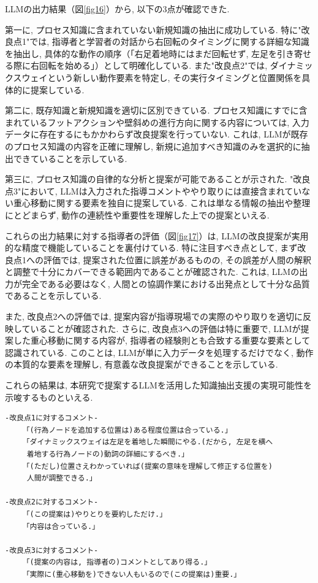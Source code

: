 LLMの出力結果（図\ref{fig16}）から, 以下の3点が確認できた.

第一に, プロセス知識に含まれていない新規知識の抽出に成功している. 特に"改良点1"では, 指導者と学習者の対話から右回転のタイミングに関する詳細な知識を抽出し, 具体的な動作の順序（「右足着地時にはまだ回転せず, 左足を引き寄せる際に右回転を始める」）として明確化している. また"改良点2"では, ダイナミックスウェイという新しい動作要素を特定し, その実行タイミングと位置関係を具体的に提案している.

第二に, 既存知識と新規知識を適切に区別できている. プロセス知識にすでに含まれているフットアクションや壁斜めの進行方向に関する内容については, 入力データに存在するにもかかわらず改良提案を行っていない. これは, LLMが既存のプロセス知識の内容を正確に理解し, 新規に追加すべき知識のみを選択的に抽出できていることを示している.

第三に, プロセス知識の自律的な分析と提案が可能であることが示された. "改良点3"において, LLMは入力された指導コメントややり取りには直接含まれていない重心移動に関する要素を独自に提案している. これは単なる情報の抽出や整理にとどまらず, 動作の連続性や重要性を理解した上での提案といえる.

これらの出力結果に対する指導者の評価（図\ref{fig17}）は, LLMの改良提案が実用的な精度で機能していることを裏付けている. 特に注目すべき点として, まず改良点1への評価では, 提案された位置に誤差があるものの, その誤差が人間の解釈と調整で十分にカバーできる範囲内であることが確認された. これは, LLMの出力が完全である必要はなく, 人間との協調作業における出発点として十分な品質であることを示している.

また, 改良点2への評価では, 提案内容が指導現場での実際のやり取りを適切に反映していることが確認された. さらに, 改良点3への評価は特に重要で, LLMが提案した重心移動に関する内容が, 指導者の経験則とも合致する重要な要素として認識されている. このことは, LLMが単に入力データを処理するだけでなく, 動作の本質的な要素を理解し, 有意義な改良提案ができることを示している.

これらの結果は, 本研究で提案するLLMを活用した知識抽出支援の実現可能性を示唆するものといえる.


\begin{tcolorbox}[breakable, colback=white, colframe=black]
    \begin{verbatim}
-改良点1に対するコメント-
    「(行為ノードを追加する位置は)ある程度位置は合っている.」
    「ダイナミックスウェイは左足を着地した瞬間にやる.(だから, 左足を横へ
     着地する行為ノードの)動詞の詳細にするべき.」
    「(ただし)位置さえわかっていれば(提案の意味を理解して修正する位置を)
     人間が調整できる.」

-改良点2に対するコメント-
    「(この提案は)やりとりを要約しただけ.」
    「内容は合っている.」

-改良点3に対するコメント-
    「(提案の内容は, 指導者の)コメントとしてあり得る.」
    「実際に(重心移動を)できない人もいるので(この提案は)重要.」
    \end{verbatim}
\end{tcolorbox}
    
